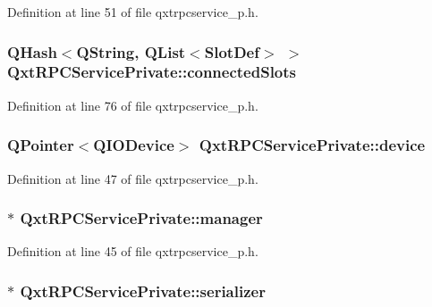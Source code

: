 Definition at line 51 of file qxtrpcservice\-\_\-p.\-h.

\hypertarget{class_qxt_r_p_c_service_private_a6161c6c107d01186e3b25282fa4b9bf6}{
\subsubsection[{connected\-Slots}]{\setlength{\rightskip}{0pt plus 5cm}Q\-Hash$<${\bf Q\-String}, {\bf Q\-List}$<${\bf Slot\-Def}$>$ $>$ Qxt\-R\-P\-C\-Service\-Private\-::connected\-Slots}}\label{class_qxt_r_p_c_service_private_a6161c6c107d01186e3b25282fa4b9bf6}


Definition at line 76 of file qxtrpcservice\-\_\-p.\-h.

\hypertarget{class_qxt_r_p_c_service_private_abe02c173d354dc63ee59e7065698ab06}{
\subsubsection[{device}]{\setlength{\rightskip}{0pt plus 5cm}Q\-Pointer$<$Q\-I\-O\-Device$>$ Qxt\-R\-P\-C\-Service\-Private\-::device}}\label{class_qxt_r_p_c_service_private_abe02c173d354dc63ee59e7065698ab06}


Definition at line 47 of file qxtrpcservice\-\_\-p.\-h.

\hypertarget{class_qxt_r_p_c_service_private_ae3513032256567da4708ca2981987a41}{
\subsubsection[{manager}]{$\ast$ Qxt\-R\-P\-C\-Service\-Private\-::manager}}\label{class_qxt_r_p_c_service_private_ae3513032256567da4708ca2981987a41}


Definition at line 45 of file qxtrpcservice\-\_\-p.\-h.

\hypertarget{class_qxt_r_p_c_service_private_a652c122f7e12c306da57ee6d20ca773e}{
\subsubsection[{serializer}]{$\ast$ Qxt\-R\-P\-C\-Service\-Private\-::serializer}}\label{class_qxt_r_p_c_service_private_a652c122f7e12c306da57ee6d20ca773e}


